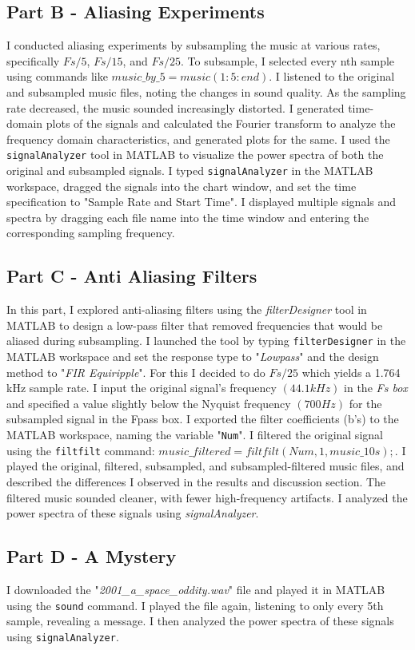 \documentclass[12pt]{article}
\newcommand{\code}[1]{\colorbox{gray!20}{\texttt{#1}}}
\begin{document}
\subsection{Part B - Aliasing Experiments}
I conducted aliasing experiments by subsampling the music at various rates, specifically \code{$Fs/5$}, \code{$Fs/15$}, and \code{$Fs/25$}. To subsample, I selected every nth sample using commands like \code{$music\_by\_5 = music(1:5:end)$}. I listened to the original and subsampled music files, noting the changes in sound quality. As the sampling rate decreased, the music sounded increasingly distorted. I generated time-domain plots of the signals and calculated the Fourier transform to analyze the frequency domain characteristics, and generated plots for the same. I used the \code{signalAnalyzer} tool in MATLAB to visualize the power spectra of both the original and subsampled signals. I typed \code{signalAnalyzer} in the MATLAB workspace, dragged the signals into the chart window, and set the time specification to "Sample Rate and Start Time". I displayed multiple signals and spectra by dragging each file name into the time window and entering the corresponding sampling frequency.
\subsection{Part C - Anti Aliasing Filters}
In this part, I explored anti-aliasing filters using the \textit{filterDesigner} tool in MATLAB to design a low-pass filter that removed frequencies that would be aliased during subsampling. I launched the tool by typing \code{filterDesigner} in the MATLAB workspace and set the response type to "\textit{Lowpass}" and the design method to "\textit{FIR Equiripple}". For this I decided to do \code{$Fs/25$} which yields a 1.764 kHz sample rate. I input the original signal's frequency $(44.1kHz)$ in the \textit{Fs box} and specified a value slightly below the Nyquist frequency $(700Hz)$ for the subsampled signal in the Fpass box. I exported the filter coefficients (b's) to the MATLAB workspace, naming the variable "\code{Num}". I filtered the original signal using the \code{filtfilt} command: \code{$music\_filtered = filtfilt(Num, 1, music\_10s);$}. I played the original, filtered, subsampled, and subsampled-filtered music files, and described the differences I observed in the results and discussion section. The filtered music sounded cleaner, with fewer high-frequency artifacts. I analyzed the power spectra of these signals using \textit{signalAnalyzer}.
\subsection{Part D - A Mystery}
I downloaded the "\textit{2001\_a\_space\_oddity.wav}" file and played it in MATLAB using the \code{sound} command. I played the file again, listening to only every 5th sample, revealing a message. I then analyzed the power spectra of these signals using \code{signalAnalyzer}.
\end{document}
